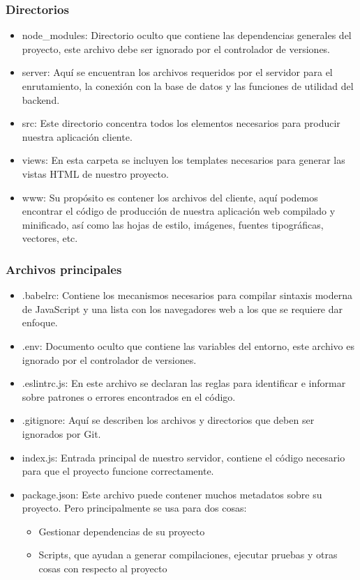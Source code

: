 \subsubsection{Directorios}
\begin{itemize}
  \item node\_modules: Directorio oculto que contiene las dependencias generales del proyecto, este archivo debe ser ignorado por el controlador de versiones.
  \item server: Aquí se encuentran los archivos requeridos por el servidor para el enrutamiento, la conexión con la base de datos y las funciones de utilidad del \gls{backend}.
  \item src: Este directorio concentra todos los elementos necesarios para producir nuestra aplicación cliente.
  \item views: En esta carpeta se incluyen los templates necesarios para generar las vistas HTML de nuestro proyecto.
  \item www: Su propósito es contener los archivos del cliente, aquí podemos encontrar el código de producción de nuestra aplicación web compilado y minificado, así como las hojas de estilo, imágenes, fuentes tipográficas, vectores, etc.
\end{itemize}

\subsubsection{Archivos principales}
\begin{itemize}
  \item .babelrc: Contiene los mecanismos necesarios para compilar sintaxis moderna de JavaScript y una lista con los navegadores web a los que se requiere dar enfoque.
  \item .env: Documento oculto que contiene las variables del entorno, este archivo es ignorado por el controlador de versiones.
  \item .eslintrc.js: En este archivo se declaran las reglas para identificar e informar sobre patrones o errores encontrados en el código.
  \item .gitignore: Aquí se describen los archivos y directorios que deben ser ignorados por Git.
  \item index.js: Entrada principal de nuestro servidor, contiene el código necesario para que el proyecto funcione correctamente.
  \item package.json: Este archivo puede contener muchos metadatos sobre su proyecto. Pero principalmente se usa para dos cosas:
  \begin{itemize}
    \item Gestionar dependencias de su proyecto
    \item Scripts, que ayudan a generar compilaciones, ejecutar pruebas y otras cosas con respecto al proyecto
  \end{itemize}
\end{itemize}

